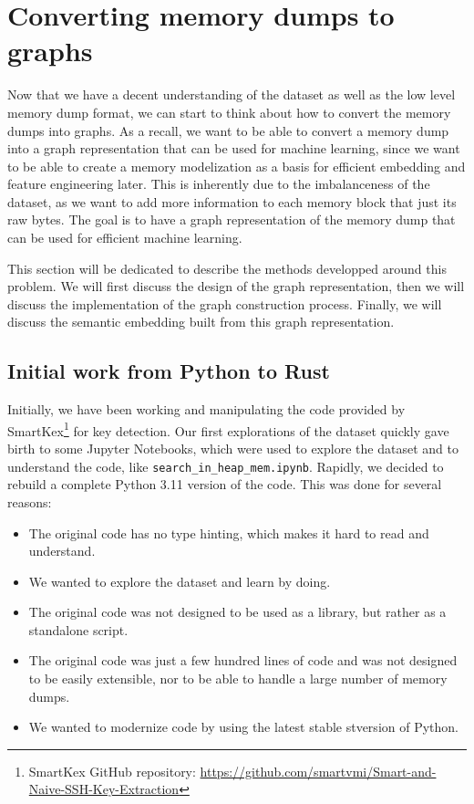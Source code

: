 
\section{Converting memory dumps to graphs}\label{chap:mem_2_graph}
Now that we have a decent understanding of the dataset as well as the low level memory dump format, we can start to think about how to convert the memory dumps into graphs. As a recall, we want to be able to convert a memory dump into a graph representation that can be used for machine learning, since we want to be able to create a memory modelization as a basis for efficient embedding and feature engineering later. This is inherently due to the imbalanceness of the dataset, as we want to add more information to each memory block that just its raw bytes. The goal is to have a graph representation of the memory dump that can be used for efficient machine learning.

This section will be dedicated to describe the methods developped around this problem. We will first discuss the design of the graph representation, then we will discuss the implementation of the graph construction process. Finally, we will discuss the semantic embedding built from this graph representation.

\subsection{Initial work from Python to Rust}

Initially, we have been working and manipulating the code provided by SmartKex\footnote{SmartKex GitHub repository: \url{https://github.com/smartvmi/Smart-and-Naive-SSH-Key-Extraction}} for key detection. Our first explorations of the dataset quickly gave birth to some Jupyter Notebooks, which were used to explore the dataset and to understand the code, like \texttt{search\_in\_heap\_mem.ipynb}. Rapidly, we decided to rebuild a complete Python 3.11 version of the code. This was done for several reasons:

\begin{itemize}
    \item The original code has no type hinting, which makes it hard to read and understand.
    \item We wanted to explore the dataset and learn by doing.
    \item The original code was not designed to be used as a library, but rather as a standalone script.
    \item The original code was just a few hundred lines of code and was not designed to be easily extensible, nor to be able to handle a large number of memory dumps.
    \item We wanted to modernize code by using the latest stable stversion of Python.
\end{itemize}

